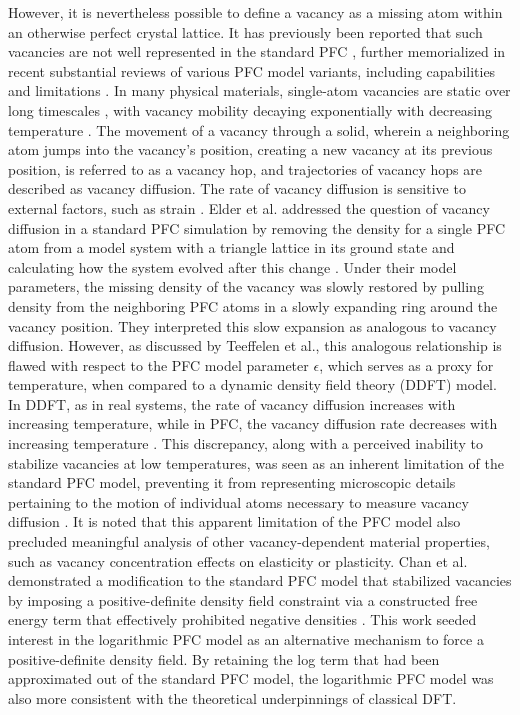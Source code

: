 
However, it is nevertheless possible to define a vacancy as a missing atom within an otherwise perfect crystal lattice.  It has previously been reported that such vacancies are not well represented in the standard PFC \cite{teeffelen2013vacancy, chan2009vacancy}, further memorialized in recent substantial reviews of various PFC model variants, including capabilities and limitations \cite{emmerich2012phase, li2021efficient-53f}.  In many physical materials, single-atom vacancies are static over long timescales \cite{wen2012_362}, with vacancy mobility decaying exponentially with decreasing temperature \cite{tovbin2014temperature-642}.  The movement of a vacancy through a solid, wherein a neighboring atom jumps into the vacancy's position, creating a new vacancy at its previous position, is referred to as a vacancy hop, and trajectories of vacancy hops are described as vacancy diffusion.  The rate of vacancy diffusion is sensitive to external factors, such as strain \cite{goyal2015impact-bed, trevethan2014vacancy-cf3}.  Elder et al. addressed the question of vacancy diffusion in a standard PFC simulation by removing the density for a single PFC atom from a model system with a triangle lattice in its ground state and calculating how the system evolved after this change \cite{elder2002modeling}.  Under their model parameters, the missing density of the vacancy was slowly restored by pulling density from the neighboring PFC atoms in a slowly expanding ring around the vacancy position.  They interpreted this slow expansion as analogous to vacancy diffusion.  However, as discussed by Teeffelen et al., this analogous relationship is flawed with respect to the PFC model parameter $\epsilon$, which serves as a proxy for temperature, when compared to a dynamic density field theory (DDFT) model.  In DDFT, as in real systems, the rate of vacancy diffusion increases with increasing temperature, while in PFC, the vacancy diffusion rate decreases with increasing temperature \cite{teeffelen2013vacancy}.  This discrepancy, along with a perceived inability to stabilize vacancies at low temperatures, was seen as an inherent limitation of the standard PFC model, preventing it from representing microscopic details pertaining to the motion of individual atoms necessary to measure vacancy diffusion \cite{chan2009vacancy}.  It is noted that this apparent limitation of the PFC model also precluded meaningful analysis of other vacancy-dependent material properties, such as vacancy concentration effects on elasticity or plasticity.  Chan et al. demonstrated a modification to the standard PFC model that stabilized vacancies by imposing a positive-definite density field constraint via a constructed free energy term that effectively prohibited negative densities \cite{chan2009vacancy}.  This work seeded interest in the logarithmic PFC model as an alternative mechanism to force a positive-definite density field.  By retaining the log term that had been approximated out of the standard PFC model, the logarithmic PFC model was also more consistent with the theoretical underpinnings of classical DFT.


